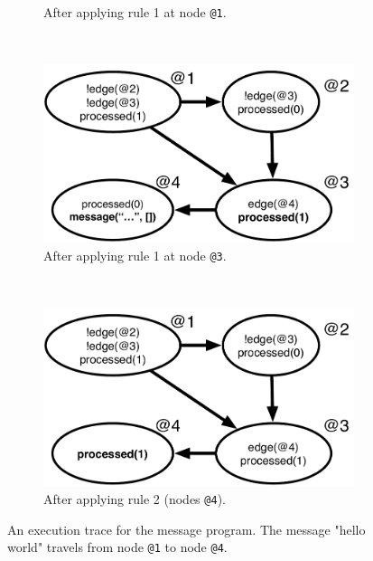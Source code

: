 \begin{figure}[h]
\begin{subfigure}[b]{0.5\textwidth}
                \caption{After applying rule 1 at node \texttt{@1}.}
                \label{fig:message_trace2}
        \end{subfigure}\\
        \begin{subfigure}[b]{0.5\textwidth}
                \includegraphics[width=\textwidth]{figures/message/message_trace3}
                \caption{After applying rule 1 at node \texttt{@3}.}
                \label{fig:message_trace3}
        \end{subfigure}%
        ~
        \begin{subfigure}[b]{0.5\textwidth}
                  \includegraphics[width=\textwidth]{figures/message/message_trace4}
                  \caption{After applying rule 2 (nodes \texttt{@4}).}
                  \label{fig:message_trace4}
          \end{subfigure}
        \caption{An execution trace for the message program. The message "hello
        world" travels from node \texttt{@1} to node \texttt{@4}.}\label{fig:message_trace}
\end{figure}

